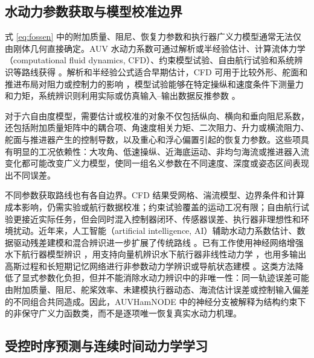 \documentclass[UTF8,zihao=-4]{ctexrep}
\begin{document}
\subsection{水动力参数获取与模型校准边界}

式 \eqref{eq:fossen} 中的附加质量、阻尼、恢复力参数和执行器广义力模型通常无法仅由刚体几何直接确定。AUV 水动力系数可通过解析或半经验估计、计算流体力学（computational fluid dynamics, CFD）、约束模型试验、自由航行试验和系统辨识等路线获得 \citep{panda2021hydrodynamicreview,ahmed2023hydrodynamiccoefficients}。解析和半经验公式适合早期估计，CFD 可用于比较外形、舵面和推进布局对阻力或控制力的影响 \citep{phillips2010cfd}，模型试验能够在特定操纵和速度条件下测量力和力矩，系统辨识则利用实际或仿真输入--输出数据反推参数 \citep{caccia2000modeling,prestero2001verification}。

对于六自由度模型，需要估计或校准的对象不仅包括纵向、横向和垂向阻尼系数，还包括附加质量矩阵中的耦合项、角速度相关力矩、二次阻力、升力或横流阻力、舵面与推进器产生的控制导数，以及重心和浮心偏置引起的恢复力参数。这些项具有明显的工况依赖性：大攻角、低速操纵、近海底运动、非均匀海流或推进器入流变化都可能改变广义力模型，使同一组名义参数在不同速度、深度或姿态区间表现出不同误差。

不同参数获取路线也有各自边界。CFD 结果受网格、湍流模型、边界条件和计算成本影响，仍需实验或航行数据校准；约束试验覆盖的运动工况有限；自由航行试验更接近实际任务，但会同时混入控制器闭环、传感器误差、执行器非理想性和环境扰动。近年来，人工智能（artificial intelligence, AI）辅助水动力系数估计、数据驱动残差建模和混合辨识进一步扩展了传统路线 \citep{ahmed2023hydrodynamiccoefficients,macatangay2024mluvdynamics,mei2025auvmaneuvering}。已有工作使用神经网络增强水下航行器模型辨识 \citep{vandeven2007nnaugmented}，用支持向量机辨识水下航行器非线性动力学 \citep{xu2013svmuv}，也用多输出高斯过程和长短期记忆网络进行非参数动力学辨识或导航状态建模 \citep{arizaramirez2021mogp,li2025uuvlstm}。这类方法降低了显式参数化负担，但并不能消除水动力辨识中的非唯一性：同一轨迹误差可能由附加质量、阻尼、舵桨效率、未建模执行器动态、海流估计误差或控制输入偏差的不同组合共同造成。因此，AUVHamNODE 中的神经分支被解释为结构约束下的非保守广义力函数类，而不是逐项唯一恢复真实水动力机理。

\subsection{受控时序预测与连续时间动力学学习}
\end{document}
